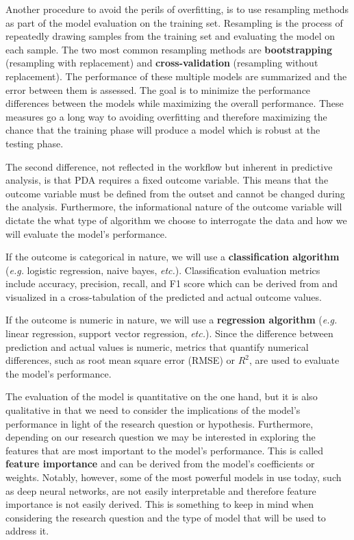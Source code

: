 \documentclass[
  letterpaper,
]{latex/krantz}
\theoremstyle{definition}
\theoremstyle{remark}
\begin{document}
Another procedure to avoid the perils of overfitting, is to use
resampling methods as part of the model evaluation on the training set.
Resampling is the process of repeatedly drawing samples from the
training set and evaluating the model on each sample. The two most
common resampling methods are \textbf{bootstrapping} (resampling with
replacement) and \textbf{cross-validation} (resampling without
replacement). The performance of these multiple models are summarized
and the error between them is assessed. The goal is to minimize the
performance differences between the models while maximizing the overall
performance. These measures go a long way to avoiding overfitting and
therefore maximizing the chance that the training phase will produce a
model which is robust at the testing phase.

The second difference, not reflected in the workflow but inherent in
predictive analysis, is that PDA requires a fixed outcome variable. This
means that the outcome variable must be defined from the outset and
cannot be changed during the analysis. Furthermore, the informational
nature of the outcome variable will dictate the what type of algorithm
we choose to interrogate the data and how we will evaluate the model's
performance.

If the outcome is categorical in nature, we will use a
\textbf{classification algorithm} (\emph{e.g.} logistic regression,
naive bayes, \emph{etc.}). Classification evaluation metrics include
accuracy, precision, recall, and F1 score which can be derived from and
visualized in a cross-tabulation of the predicted and actual outcome
values.

If the outcome is numeric in nature, we will use a \textbf{regression
algorithm} (\emph{e.g.} linear regression, support vector regression,
\emph{etc.}). Since the difference between prediction and actual values
is numeric, metrics that quantify numerical differences, such as root
mean square error (RMSE) or \(R^2\), are used to evaluate the model's
performance.

The evaluation of the model is quantitative on the one hand, but it is
also qualitative in that we need to consider the implications of the
model's performance in light of the research question or hypothesis.
Furthermore, depending on our research question we may be interested in
exploring the features that are most important to the model's
performance. This is called \textbf{feature importance} and can be
derived from the model's coefficients or weights. Notably, however, some
of the most powerful models in use today, such as deep neural networks,
are not easily interpretable and therefore feature importance is not
easily derived. This is something to keep in mind when considering the
research question and the type of model that will be used to address it.
\end{document}
